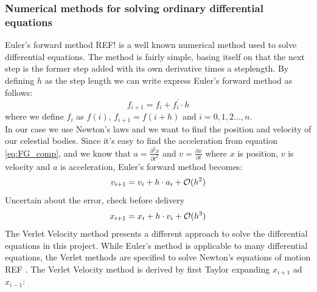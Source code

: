 \documentclass{article}
\newcommand{\husk}[1]{\color{red} #1 \color{black}}
\begin{document}
\subsubsection{Numerical methods for solving ordinary differential equations}
Euler's forward method \husk{REF!} is a well known numerical method used to solve differential equations. The method is fairly simple, basing itself on that the next step is the former step added with its own derivative times a steplength. By defining $h$ as the step length we can write express Euler's forward method as follows:
\begin{equation}
f_{i + 1} = f_i + f^{'}_i \cdot h
\label{eq:fwdEuler}
\end{equation}
where we define $f_i$ as $f(i)$, $f_{i+1} = f(i + h)$ and $i = 0, 1, 2 ... , n$. \\
In our case we use Newton's laws and we want to find the position and velocity of our celestial bodies. Since it's easy to find the acceleration from equation \eqref{eq:FG_comp}, and we know that $a = \frac{\partial^2 x}{\partial t^2}$ and $v = \frac{\partial x}{\partial t}$ where $x$ is position, $v$ is velocity and $a$ is acceleration, Euler's forward method becomes:
\begin{equation}
v_{i + 1} = v_i + h \cdot a_i + \mathcal{O}(h^2)\\
\label{eq:Eulervel}
\end{equation}
\husk{Uncertain about the error, check before delivery}
\begin{equation}
x_{i + 1} = x_i + h \cdot v_i + \mathcal{O}(h^3)\\
\label{eq:Eulerpos}
\end{equation}
The Verlet Velocity method presents a different approach to solve the differential equations in this project. While Euler's method is applicable to many differential equations, the Verlet methods are specified to solve Newton's equations of motion \husk{REF}. The Verlet Velocity method is derived by first Taylor expanding $x_{i + 1}$ ad $x_{i-1}$:
\end{document}
